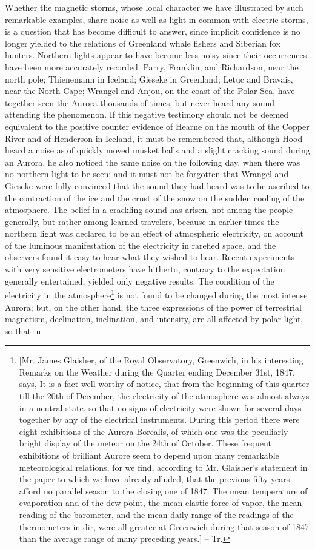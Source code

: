 Whether the magnetic storms, whose local character we have illustrated by such remarkable examples, share noise as well as light in common with electric storms, is a question that has become difficult to answer, since implicit confidence is no longer yielded to the relations of Greenland whale fishers and Siberian fox hunters. Northern lights appear to have become less noisy since their occurrences have been more accurately recorded. Parry, Franklin, and Richardson, near the north pole; Thienemann in Iceland; Gieseke in Greenland; Letuc and Bravais, near the North Cape; Wrangel and Anjou, on the coast of the Polar Sea, have together seen the Aurora thousands of times, but never heard any sound attending the phenomenon. If this negative testimony should not be deemed equivalent to the positive counter evidence of Hearne on the mouth of the Copper River and of Henderson in Iceland, it must be remembered that, although Hood heard a noise as of quickly moved musket balls and a slight cracking sound during an Aurora, he also noticed the same noise on the following day, when there was no northern light to be seen; and it must not be forgotten that Wrangel and Gieseke were fully convinced that the sound they had heard was to be ascribed to the contraction of the ice and the crust of the snow on the sudden cooling of the atmosphere. The belief in a crackling sound has arisen, not among the people generally, but rather among learned travelers, because in earlier times the northern light was declared to be an effect of atmospheric electricity, on account of the luminous manifestation of the electricity in rarefied space, and the observers found it easy to hear what they wished to hear. Recent experiments with very sensitive electrometers have hitherto, contrary to the expectation generally entertained, yielded only negative results. The condition of the electricity in the atmosphere\footnote{[Mr. James Glaisher, of the Royal Observatory, Greenwich, in his interesting Remarks on the Weather during the Quarter ending December 31st, 1847, says, It is a fact well worthy of notice, that from the beginning of this quarter till the 20th of December, the electricity of the atmosphere was almost always in a neutral state, so that no signs of electricity were shown for several days together by any of the electrical instruments. During this period there were eight exhibitions of the Aurora Borealis, of which one was the peculiarly bright display of the meteor on the 24th of October. These frequent exhibitions of brilliant Aurore seem to depend upon many remarkable meteorological relations, for we find, according to Mr. Glaisher's statement in the paper to which we have already alluded, that the previous fifty years afford no parallel season to the closing one of 1847. The mean temperature of evaporation and of the dew point, the mean elastic force of vapor, the mean reading of the barometer, and the mean daily range of the readings of the thermometers in dir, were all greater at Greenwich during that season of 1847 than the average range of many preceding years.] -- Tr.} is not found to be changed during the most intense Aurora; but, on the other hand, the three expressions of the power of terrestrial magnetism, declination, inclination, and intensity, are all affected by polar light, so that in 